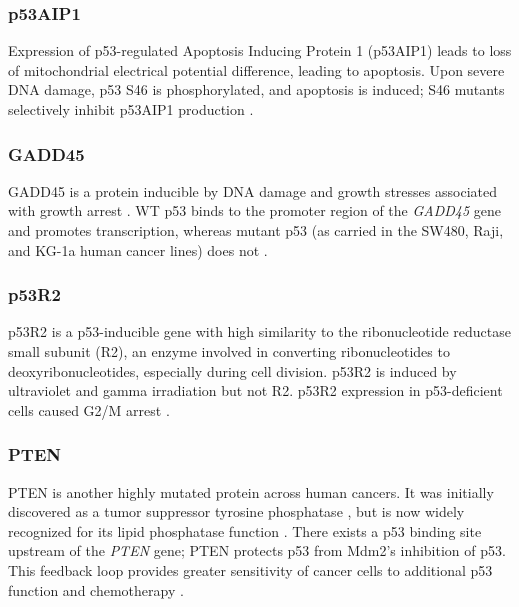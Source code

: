 \subsubsection{p53AIP1}

Expression of p53-regulated Apoptosis Inducing Protein 1 (p53AIP1) leads to loss of mitochondrial electrical potential difference, leading to apoptosis. Upon severe DNA damage, p53 S46 is phosphorylated, and apoptosis is induced; S46 mutants selectively inhibit p53AIP1 production \parencite{odaP53AIP1PotentialMediator2000}.

\subsubsection{GADD45}

GADD45 is a protein inducible by DNA damage and growth stresses associated with growth arrest \parencite{fornaceDNADamageinducibleTranscripts1988}. WT p53 binds to the promoter region of the \textit{GADD45} gene and promotes transcription, whereas mutant p53 (as carried in the SW480, Raji, and KG-1a human cancer lines) does not \parencite{kastanMammalianCellCycle1992}.

\subsubsection{p53R2}

p53R2 is a p53-inducible gene with high similarity to the ribonucleotide reductase small subunit (R2), an enzyme involved in converting ribonucleotides to deoxyribonucleotides, especially during cell division. p53R2 is induced by ultraviolet and gamma irradiation but not R2. p53R2 expression in p53-deficient cells caused G2/M arrest \parencite{tanakaRibonucleotideReductaseGene2000}.

\subsubsection{PTEN}

PTEN is another highly mutated protein across human cancers. It was initially discovered as a tumor suppressor tyrosine phosphatase \parencite{liPTENPutativeProtein1997, steckIdentificationCandidateTumour1997, liTEP1EncodedCandidate1997}, but is now widely recognized for its lipid phosphatase function \parencite{maehamaTumorSuppressorPTEN1998}. There exists a p53 binding site upstream of the \textit{PTEN} gene; PTEN protects p53 from Mdm2’s inhibition of p53. This feedback loop provides greater sensitivity of cancer cells to additional p53 function and chemotherapy \parencite{stambolicRegulationPTENTranscription2001, mayoPTENProtectsP532002, leeFunctionsRegulationPTEN2018}.

